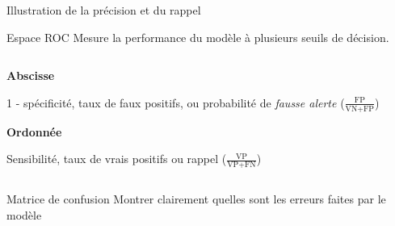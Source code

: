\begin{frame}{Illustration de la précision et du rappel}
\end{frame}

\begin{frame}{Espace ROC}
  Mesure la performance du modèle à plusieurs seuils de décision.
  \begin{columns}
    \begin{column}{.48\textwidth}
      \textbf{Abscisse}

      1 - spécificité, taux de faux positifs, ou probabilité de \emph{fausse alerte} ($\frac{\text{FP}}{\text{VN} + \text{FP}}$)
 
      \vspace{1cm}
      \textbf{Ordonnée}
  
      Sensibilité, taux de vrais positifs ou rappel ($\frac{\text{VP}}{\text{VP} + \text{FN}}$)
    \end{column}
    \begin{column}{.52\textwidth}
    \end{column}
  \end{columns}
\end{frame}

\begin{frame}{Matrice de confusion}
  Montrer clairement quelles sont les erreurs faites par le modèle
\end{frame}
